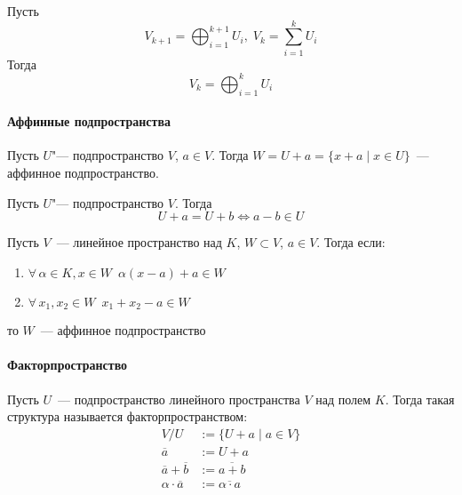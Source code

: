 \documentclass[12pt]{../../../notes}
\begin{document}
\begin{stat}\label{stat:dirsumsubfact}
  Пусть 
  \[
    V_{k+1} = \bigoplus_{i=1}^{k+1} U_i, \; V_k = \sum_{i=1}^k U_i
  \]
  Тогда
  \[
    V_k = \bigoplus_{i=1}^k U_i
  \]
\end{stat}

\paragraph{Аффинные подпространства}

\begin{defn}\label{defn:affinsubspc}
  Пусть $U$"--- подпространство $V$, $a\in V$. Тогда $W = U + a = \{x+a\mid x\in U\}$~--- аффинное 
  подпространство. 
\end{defn}

\begin{lem}\label{lem:affinfact}
  Пусть $U$"--- подпространство $V$. Тогда
  \[
    U + a = U + b \Leftrightarrow a - b \in U
  \]
\end{lem}
\begin{lem}\label{lem:affinprop}
  Пусть $V$~--- линейное пространство над $K$, $W \subset V$, $a\in V$.
  Тогда если:
  \begin{enumerate}
    \item $\forall\, \alpha \in K, x \in W \;\: \alpha(x-a) + a \in W$  
    \item $\forall\, x_1,x_2 \in W \;\: x_1 + x_2 - a \in W$  
  \end{enumerate}
  то $W$~--- аффинное подпространство
\end{lem}

\paragraph{Факторпространство}
\begin{defn}\label{defn:factorspace}
  Пусть $U$~--- подпространство линейного пространства $V$ над полем $K$.
  Тогда такая структура называется факторпространством:
  \begin{align*}
    V / U &:= \{ U + a \mid a\in  V \} \\
    \overline a &:= U+a \\
    \overline a + \overline b &:= \overline{a+b} \\
    \alpha \cdot \overline a &:= \overline{\alpha \cdot a}
  \end{align*}
\end{defn}
\end{document}
